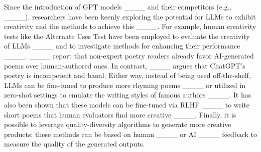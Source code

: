 Since the introduction of GPT models ____ and their competitors (e.g., ____), researchers have been keenly exploring the potential for LLMs to exhibit creativity and the methods to achieve this ____. For example, human creativity tests like the Alternate Uses Test have been employed to evaluate the creativity of LLMs ____ and to investigate methods for enhancing their performance ____.
____ report that non-expert poetry readers already favor AI-generated poems over human-authored ones. In contrast, ____ argues that ChatGPT's poetry is incompetent and banal. Either way, instead of being used off-the-shelf, LLMs can be fine-tuned to produce more rhyming poems ____ or utilized in zero-shot settings to emulate the writing styles of famous authors ____. 
It has also been shown that these models can be fine-tuned via RLHF ____ to write short poems that human evaluators find more creative ____. 
Finally, it is possible to leverage quality-diversity algorithms to generate more creative products; these methods can be based on human ____ or AI ____ feedback to measure the quality of the generated outputs.
